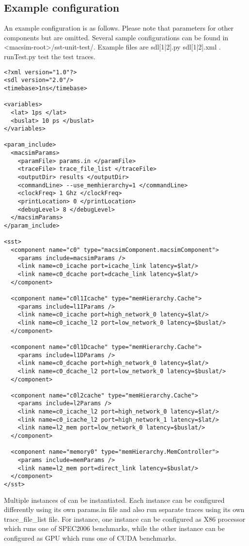 \subsection{Example configuration}

An example configuration is as follows.
Please note that parameters for other components but \SIM are omitted.
Several sample configurations can be found in
<macsim-root>/sst-unit-test/.
Example files are sdl[1|2].py sdl[1|2].xml . runTest.py test the test
traces. 

\begin{Verbatim}
<?xml version="1.0"?>
<sdl version="2.0"/>
<timebase>1ns</timebase>

<variables>
  <lat> 1ps </lat>
  <buslat> 10 ps </buslat>
</variables>

<param_include>
  <macsimParams>
    <paramFile> params.in </paramFile>
    <traceFile> trace_file_list </traceFile>
    <outputDir> results </outputDir>
    <commandLine> --use_memhierarchy=1 </commandLine>
    <clockFreq> 1 Ghz </clockFreq>
    <printLocation> 0 </printLocation>
    <debugLevel> 8 </debugLevel>
  </macsimParams>
</param_include>

<sst>
  <component name="c0" type="macsimComponent.macsimComponent">
    <params include=macsimParams />
    <link name=c0_icache port=icache_link latency=$lat/>
    <link name=c0_dcache port=dcache_link latency=$lat/>
  </component>

  <component name="c0l1Icache" type="memHierarchy.Cache">
    <params include=l1IParams />
    <link name=c0_icache port=high_network_0 latency=$lat/>
    <link name=c0_icache_l2 port=low_network_0 latency=$buslat/>
  </component>

  <component name="c0l1Dcache" type="memHierarchy.Cache">
    <params include=l1DParams />
    <link name=c0_dcache port=high_network_0 latency=$lat/>
    <link name=c0_dcache_l2 port=low_network_0 latency=$buslat/>
  </component>

  <component name="c0l2cache" type="memHierarchy.Cache">
    <params include=l2Params />
    <link name=c0_icache_l2 port=high_network_0 latency=$lat/>
    <link name=c0_icache_l2 port=high_network_1 latency=$lat/>
    <link name=l2_mem port=low_network_0 latency=$buslat/>
  </component>

  <component name="memory0" type="memHierarchy.MemController">
    <params include=memParams />
    <link name=l2_mem port=direct_link latency=$buslat/>
  </component>
</sst>
\end{Verbatim}
Multiple instances of \SIM can be instantiated.
Each instance can be configured differently using its own params.in file and also run separate traces using its own trace\_file\_list file.
For instance, one \SIM instance can be configured as X86 processor which runs one of SPEC2006 benchmarks, while the other \SIM instance can be configured as GPU which runs one of CUDA benchmarks. 

